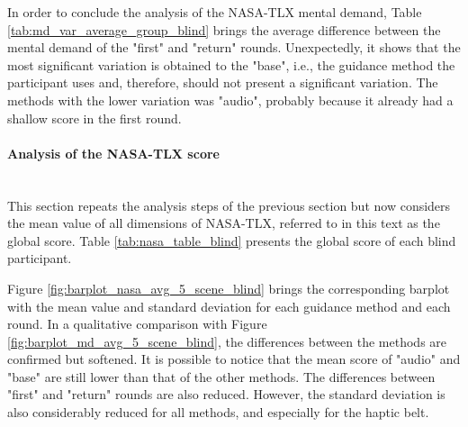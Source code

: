 

In order to conclude the analysis of the NASA-TLX mental demand, Table \ref{tab:md_var_average_group_blind} brings the average difference between the mental demand of the "first" and "return" rounds. Unexpectedly, it shows that the most significant variation is obtained to the "base", i.e., the guidance method the participant uses and, therefore, should not present a significant variation. The methods with the lower variation was "audio", probably because it already had a shallow score in the first round. 



\FloatBarrier



\paragraph{Analysis of the NASA-TLX score}\mbox{}\\

This section repeats the analysis steps of the previous section but now considers the mean value of all dimensions of NASA-TLX, referred to in this text as the global score. Table \ref{tab:nasa_table_blind} presents the global score of each blind participant. 



Figure \ref{fig:barplot_nasa_avg_5_scene_blind} brings the corresponding barplot with the mean value and standard deviation for each guidance method and each round. In a qualitative comparison with Figure \ref{fig:barplot_md_avg_5_scene_blind}, the differences between the methods are confirmed but softened. It is possible to notice that the mean score of "audio" and "base" are still lower than that of the other methods. The differences between "first" and "return" rounds are also reduced. However, the standard deviation is also considerably reduced for all methods, and especially for the haptic belt.

